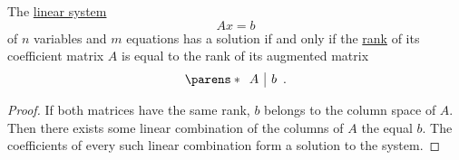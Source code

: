 \begin{theorem}\label{thm:kroneker_capelli}
  The \hyperref[rem:system_of_equations]{linear system}
  \begin{equation*}
    Ax = b
  \end{equation*}
  of \( n \) variables and \( m \) equations has a solution if and only if the \hyperref[def:column_and_row_spaces]{rank} of its coefficient matrix \( A \) is equal to the rank of its augmented matrix
  \begin{equation*}
    \parens*
    {
      \begin{array}{c|c}
        A & b
      \end{array}
    }.
  \end{equation*}
\end{theorem}
\begin{proof}
  If both matrices have the same rank, \( b \) belongs to the column space of \( A \). Then there exists some linear combination of the columns of \( A \) the equal \( b \). The coefficients of every such linear combination form a solution to the system.
\end{proof}
